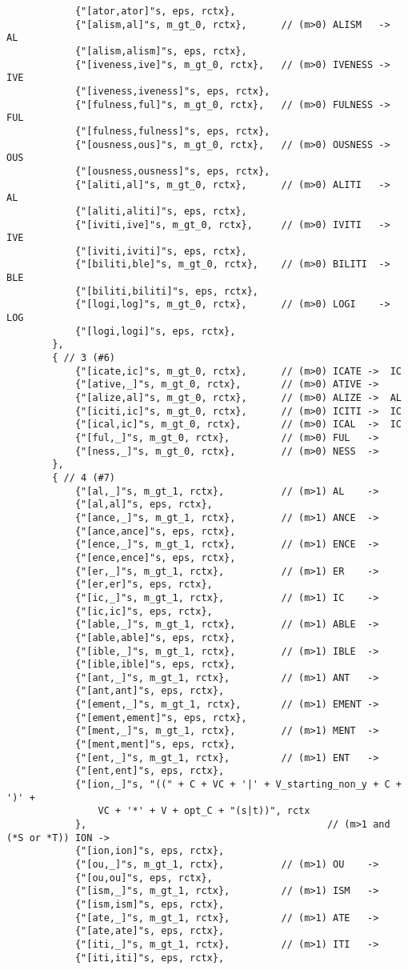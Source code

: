 \documentclass{article}
\begin{document}
\begin{appendices}
\begin{verbatim}
			{"[ator,ator]"s, eps, rctx},
			{"[alism,al]"s, m_gt_0, rctx},		// (m>0) ALISM   ->  AL
			{"[alism,alism]"s, eps, rctx},
			{"[iveness,ive]"s, m_gt_0, rctx},	// (m>0) IVENESS ->  IVE
			{"[iveness,iveness]"s, eps, rctx},
			{"[fulness,ful]"s, m_gt_0, rctx},	// (m>0) FULNESS ->  FUL
			{"[fulness,fulness]"s, eps, rctx},
			{"[ousness,ous]"s, m_gt_0, rctx},	// (m>0) OUSNESS ->  OUS
			{"[ousness,ousness]"s, eps, rctx},
			{"[aliti,al]"s, m_gt_0, rctx},		// (m>0) ALITI   ->  AL
			{"[aliti,aliti]"s, eps, rctx},
			{"[iviti,ive]"s, m_gt_0, rctx},		// (m>0) IVITI   ->  IVE
			{"[iviti,iviti]"s, eps, rctx},
			{"[biliti,ble]"s, m_gt_0, rctx},	// (m>0) BILITI  ->  BLE
			{"[biliti,biliti]"s, eps, rctx},
			{"[logi,log]"s, m_gt_0, rctx},		// (m>0) LOGI    ->  LOG
			{"[logi,logi]"s, eps, rctx},
		},
		{ // 3 (#6)
			{"[icate,ic]"s, m_gt_0, rctx},		// (m>0) ICATE ->  IC
			{"[ative,_]"s, m_gt_0, rctx},		// (m>0) ATIVE ->
			{"[alize,al]"s, m_gt_0, rctx},		// (m>0) ALIZE ->  AL
			{"[iciti,ic]"s, m_gt_0, rctx},		// (m>0) ICITI ->  IC
			{"[ical,ic]"s, m_gt_0, rctx},		// (m>0) ICAL  ->  IC
			{"[ful,_]"s, m_gt_0, rctx},			// (m>0) FUL   ->
			{"[ness,_]"s, m_gt_0, rctx},		// (m>0) NESS  ->
		},
		{ // 4 (#7)
			{"[al,_]"s, m_gt_1, rctx},			// (m>1) AL    ->
			{"[al,al]"s, eps, rctx},
			{"[ance,_]"s, m_gt_1, rctx},		// (m>1) ANCE  ->
			{"[ance,ance]"s, eps, rctx},
			{"[ence,_]"s, m_gt_1, rctx},		// (m>1) ENCE  ->
			{"[ence,ence]"s, eps, rctx},
			{"[er,_]"s, m_gt_1, rctx},			// (m>1) ER    ->
			{"[er,er]"s, eps, rctx},
			{"[ic,_]"s, m_gt_1, rctx},			// (m>1) IC    ->
			{"[ic,ic]"s, eps, rctx},
			{"[able,_]"s, m_gt_1, rctx},		// (m>1) ABLE  ->
			{"[able,able]"s, eps, rctx},
			{"[ible,_]"s, m_gt_1, rctx},		// (m>1) IBLE  ->
			{"[ible,ible]"s, eps, rctx},
			{"[ant,_]"s, m_gt_1, rctx},			// (m>1) ANT   ->
			{"[ant,ant]"s, eps, rctx},
			{"[ement,_]"s, m_gt_1, rctx},		// (m>1) EMENT ->
			{"[ement,ement]"s, eps, rctx},
			{"[ment,_]"s, m_gt_1, rctx},		// (m>1) MENT  ->
			{"[ment,ment]"s, eps, rctx},
			{"[ent,_]"s, m_gt_1, rctx},			// (m>1) ENT   ->
			{"[ent,ent]"s, eps, rctx},
			{"[ion,_]"s, "((" + C + VC + '|' + V_starting_non_y + C + ')' +
				VC + '*' + V + opt_C + "(s|t))", rctx
			},											// (m>1 and (*S or *T)) ION ->
			{"[ion,ion]"s, eps, rctx},
			{"[ou,_]"s, m_gt_1, rctx},			// (m>1) OU    ->
			{"[ou,ou]"s, eps, rctx},
			{"[ism,_]"s, m_gt_1, rctx},			// (m>1) ISM   ->
			{"[ism,ism]"s, eps, rctx},
			{"[ate,_]"s, m_gt_1, rctx},			// (m>1) ATE   ->
			{"[ate,ate]"s, eps, rctx},
			{"[iti,_]"s, m_gt_1, rctx},			// (m>1) ITI   ->
			{"[iti,iti]"s, eps, rctx},

\end{verbatim}
\end{appendices}
\end{document}
